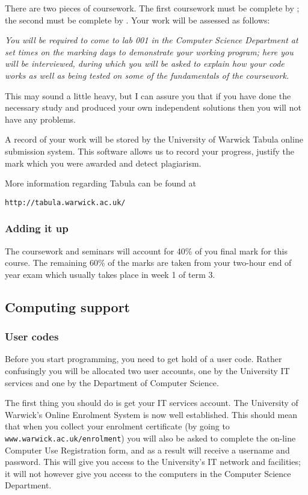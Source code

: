 There are two pieces of coursework. The first coursework must be complete 
by \deadlineone; the second must be complete by 
\deadlinetwo. Your work will be assessed as follows:

{\it You will be required to come to lab 001 in the Computer Science 
Department at set times on the marking days to demonstrate 
your working program; here you will be interviewed, during which you will 
be asked to explain how your code works
as well as being tested on some of the fundamentals of the coursework.}

This may sound a little heavy, but I can assure you that if you have done 
the necessary study and produced your own independent solutions then you will not 
have any problems.

A record of your work will be stored by the University of Warwick 
Tabula online submission system. This software allows us to record your 
progress, justify the mark which you were awarded and detect plagiarism.

More information regarding Tabula can be found at 

{\tt http://tabula.warwick.ac.uk/}

\subsubsection{Adding it up}

The coursework and seminars will account for 40\% of you final 
mark for this course. The remaining 60\% of the marks are taken from your 
two-hour end of year exam which usually takes place in week 1 of term 3.

\subsection{Computing support}

\subsubsection{User codes}

Before you start programming, you need to get hold of a user code. 
Rather confusingly you will be allocated two user accounts, one by the 
University IT services and one by the Department of Computer 
Science.
 
The first thing you should do is get your IT services account.
The University of Warwick's Online Enrolment System is now well established.  
This should mean that when you collect your enrolment
certificate (by going to {\tt www.warwick.ac.uk/enrolment}) you will also be asked to complete the on-line Computer
Use Registration form, and as a result will receive a username and password. 
This will give you access to the University's IT network and facilities; it 
will not however give you access to the computers in the Computer Science
Department. 
 
